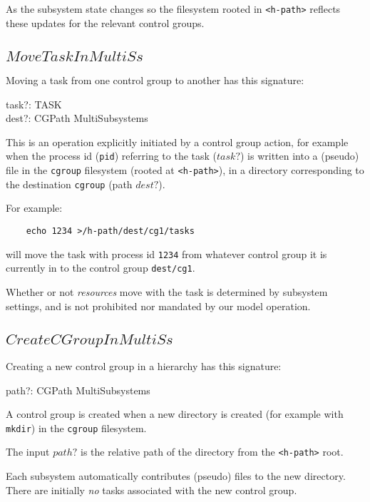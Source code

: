 \documentclass[a4paper,twoside,12pt]{article}
\begin{document}
As the subsystem state changes so the
filesystem rooted in \texttt{<h-path>} reflects these updates for the relevant control groups.


\subsection{$MoveTaskInMultiSs$}

Moving a task from one control group to another has this signature:
\begin{schema*}
    task?: TASK \\
    dest?: CGPath
\also 
    \Delta MultiSubsystems
\end{schema*}
This is an operation explicitly initiated by a control group action, for example when
the process id (\texttt{pid}) referring to the task ($task?$) is written into a 
(pseudo) file in the \texttt{cgroup} filesystem 
(rooted at \texttt{<h-path>}),
in a directory corresponding to the destination \texttt{cgroup} (path $dest?$).

For example:
\begin{verbatim}
    echo 1234 >/h-path/dest/cg1/tasks
\end{verbatim}
will move the task with process id \texttt{1234} from whatever control group it is currently in to 
the control group \texttt{dest/cg1}.

Whether or not \emph{resources} move with the task is determined by subsystem settings, and is not
prohibited nor mandated by our model operation.

\subsection{$CreateCGroupInMultiSs$}

Creating a new control group in a hierarchy has this signature:
\begin{schema*}
    path?: CGPath
\also 
    \Delta MultiSubsystems
\end{schema*}
A control group is created when a new directory is created (for example with \texttt{mkdir}) 
in the \texttt{cgroup} filesystem.

The input $path?$ is the relative path of the directory from the \texttt{<h-path>} root.

Each subsystem automatically contributes
(pseudo) files to the new directory. There are initially \emph{no} tasks associated with the new control group.
\end{document}
